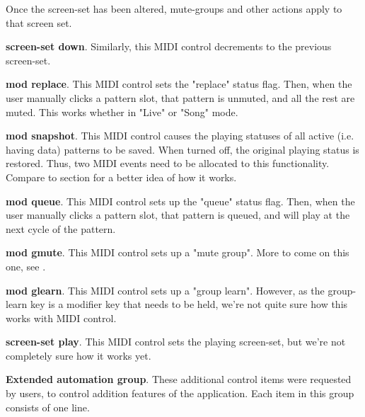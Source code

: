 \begin{enumber}
\begin{enumber}
               Once the screen-set has been altered, mute-groups and other
               actions apply to that screen set.
            \item \textbf{screen-set down}.
               Similarly, this MIDI control decrements to the previous
               screen-set.
            \item \textbf{mod replace}.
               This MIDI control sets the "replace" status flag.
               Then, when the user manually clicks a pattern slot,
               that pattern is unmuted, and all the rest are muted.
               This works whether in "Live" or "Song" mode.
            \item \textbf{mod snapshot}.
               This MIDI control causes the playing statuses of all active
               (i.e. having data) patterns to be saved.  When turned off, the
               original playing status is restored.  Thus, two MIDI events
               need to be allocated to this functionality. Compare
               to section 
               for a better idea of how it works.
            \item \textbf{mod queue}.
               This MIDI control sets up the "queue" status flag.
               Then, when the user manually clicks a pattern slot,
               that pattern is queued, and will play at the next cycle of the
               pattern.
            \item \textbf{mod gmute}.
               This MIDI control sets up a "mute group".
               More to come on this one,
               see .
            \item \textbf{mod glearn}.
               This MIDI control sets up a "group learn".
               However, as the group-learn key is a modifier key that needs to
               be held, we're not quite sure how this works with MIDI control.
            \item \textbf{screen-set play}.
               This MIDI control sets the playing screen-set, 
               but we're not completely sure how it works yet.
         \end{enumber}
      \item \textbf{Extended automation group}.
         These additional control items were requested by users, to control
         addition features of the application.
         Each item in this group consists of one line.

\end{enumber}
